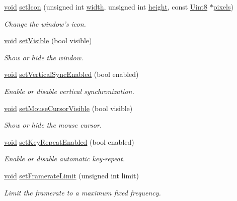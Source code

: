\begin{DoxyCompactItemize}
\hyperlink{glutf90_8h_ac778d6f63f1aaf8ebda0ce6ac821b56e}{void} \hyperlink{classsf_1_1_window_a63af61e026fba08e3153fd013620bcc0}{set\-Icon} (unsigned int \hyperlink{gl3_8h_a9d14ddc31c6c8b61f3fe3679ab976133}{width}, unsigned int \hyperlink{gl3_8h_a67001679ebf2bb0ba972db4d29c6550c}{height}, const \hyperlink{namespacesf_a4ef3d630785c4f296f9b4f274c33d78e}{Uint8} $\ast$\hyperlink{gl3_8h_ada7ad693ea2e311b8103f4693fc35f80}{pixels})
\begin{DoxyCompactList}\small\item\em Change the window's icon. \end{DoxyCompactList}\item 
\hyperlink{glutf90_8h_ac778d6f63f1aaf8ebda0ce6ac821b56e}{void} \hyperlink{classsf_1_1_window_a160f7f11a207603d7e99ce606e749703}{set\-Visible} (bool visible)
\begin{DoxyCompactList}\small\item\em Show or hide the window. \end{DoxyCompactList}\item 
\hyperlink{glutf90_8h_ac778d6f63f1aaf8ebda0ce6ac821b56e}{void} \hyperlink{classsf_1_1_window_a59041c4556e0351048f8aff366034f61}{set\-Vertical\-Sync\-Enabled} (bool enabled)
\begin{DoxyCompactList}\small\item\em Enable or disable vertical synchronization. \end{DoxyCompactList}\item 
\hyperlink{glutf90_8h_ac778d6f63f1aaf8ebda0ce6ac821b56e}{void} \hyperlink{classsf_1_1_window_aad3991c25e0a83afbb4d62febf9b7b14}{set\-Mouse\-Cursor\-Visible} (bool visible)
\begin{DoxyCompactList}\small\item\em Show or hide the mouse cursor. \end{DoxyCompactList}\item 
\hyperlink{glutf90_8h_ac778d6f63f1aaf8ebda0ce6ac821b56e}{void} \hyperlink{classsf_1_1_window_aef9f2b14c10ecba8a8df95dd51c5bb73}{set\-Key\-Repeat\-Enabled} (bool enabled)
\begin{DoxyCompactList}\small\item\em Enable or disable automatic key-\/repeat. \end{DoxyCompactList}\item 
\hyperlink{glutf90_8h_ac778d6f63f1aaf8ebda0ce6ac821b56e}{void} \hyperlink{classsf_1_1_window_af4322d315baf93405bf0d5087ad5e784}{set\-Framerate\-Limit} (unsigned int limit)
\begin{DoxyCompactList}\small\item\em Limit the framerate to a maximum fixed frequency. \end{DoxyCompactList}\item 

\end{DoxyCompactItemize}
